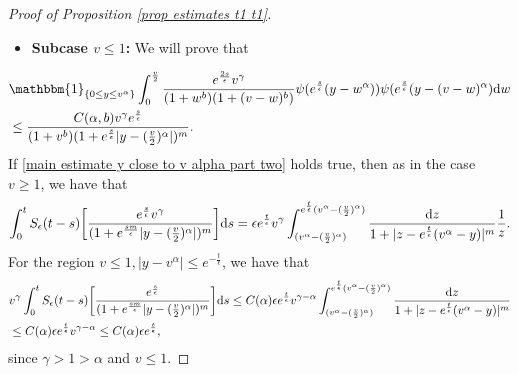 \documentclass[11pt]{article}
\numberwithin{equation}{section}
\newcommand{\der}{\textup{d}}
\begin{document}
\begin{proof}[Proof of Proposition 
\ref{prop estimates t1 t1}]
     \begin{itemize}
    \item \textbf{Subcase $v\leq 1$:} We will prove that 
\end{itemize}
\begin{align}\label{main estimate y close to v alpha part two}
&\mathbbm{1}_{\{0\leq y \leq v^{\alpha}\}}\int_{0}^{\frac{v}{2}}\frac{e^{\frac{2s}{\epsilon}}v^{\gamma}}{(1+w^{b})(1+(v-w)^{b})}\psi(e^{\frac{s}{\epsilon}}(y-w^{\alpha}))\psi(e^{\frac{s}{\epsilon}}(y-(v-w)^{\alpha})\der w\nonumber\\
&\leq \frac{C(\alpha,b) v^{\gamma}e^{\frac{s}{\epsilon}}}{(1+v^{b})(1+e^{\frac{s}{\epsilon}}|y-(\frac{v}{2})^{\alpha}|)^{m}}.
  \end{align}
  If \eqref{main estimate y close to v alpha part two} holds true, then as in the case $v\geq 1$, we have that
  \begin{align*}
      \int_{0}^{t}S_{\epsilon}(t-s)\bigg[\frac{ e^{\frac{s}{\epsilon}}v^{\gamma}}{(1+e^{\frac{sm}{\epsilon}}|y-(\frac{v}{2})^{\alpha}|)^{m}}\bigg]\der s= \epsilon e^{\frac{t}{\epsilon}}v^{\gamma} \int_{(v^{\alpha}-(\frac{v}{2})^{\alpha})}^{e^{\frac{t}{\epsilon}}(v^{\alpha}-(\frac{v}{2})^{\alpha})}\frac{\der z}{1+|z-e^{\frac{t}{\epsilon}}(v^{\alpha}-y)|^{m}}\frac{1}{z}.
      \end{align*}
      For the region $v\leq 1, |y-v^{\alpha}|\leq  e^{-\frac{t}{\epsilon}}$, we have that
\begin{align*}
 &   v^{\gamma} \int_{0}^{t}S_{\epsilon}(t-s)\bigg[\frac{ e^{\frac{s}{\epsilon}}}{(1+e^{\frac{sm}{\epsilon}}|y-(\frac{v}{2})^{\alpha}|)^{m}}\bigg]\der s\leq C(\alpha)\epsilon e^{\frac{t}{\epsilon}} v^{\gamma-\alpha}\int_{(v^{\alpha}-(\frac{v}{2})^{\alpha})}^{e^{\frac{t}{\epsilon}}(v^{\alpha}-(\frac{v}{2})^{\alpha})}\frac{\der z}{1+|z-e^{\frac{t}{\epsilon}}(v^{\alpha}-y)|^{m}}\\
    &\leq C(\alpha)\epsilon e^{\frac{t}{\epsilon}}v^{\gamma-\alpha} \leq  C(\alpha)\epsilon e^{\frac{t}{\epsilon}},
\end{align*}
since $\gamma>1>\alpha$ and $v\leq 1$.



\end{proof}
\end{document}
